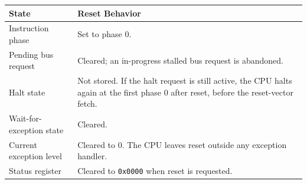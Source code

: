 \begin{table}[H]
	\centering
	\begin{tabularx}{\textwidth}{l>{\raggedright\arraybackslash}X}
		\toprule
		\textbf{State}                         & \textbf{Reset Behavior}                                                                                                                                                                                                                                                                 \\
		\midrule
		Instruction phase                      & Set to phase 0.                                                                                                                                                                                                                                                                         \\
		Pending bus request                    & Cleared; an in-progress stalled bus request is abandoned.                                                                                                                                                                                                                               \\
		Halt state                             & Not stored. If the halt request is still active, the CPU halts again at the first phase 0 after reset, before the reset-vector fetch.                                                                                                                                                   \\
		Wait-for-exception state               & Cleared.                                                                                                                                                                                                                                                                                \\
		Current exception level                & Cleared to 0. The CPU leaves reset outside any exception handler.                                                                                                                                                                                                                       \\
		Status register                        & Cleared to \texttt{0x0000} when reset is requested.                                                                                                                                                                                                                                     \\

\end{tabularx}
\end{table}

